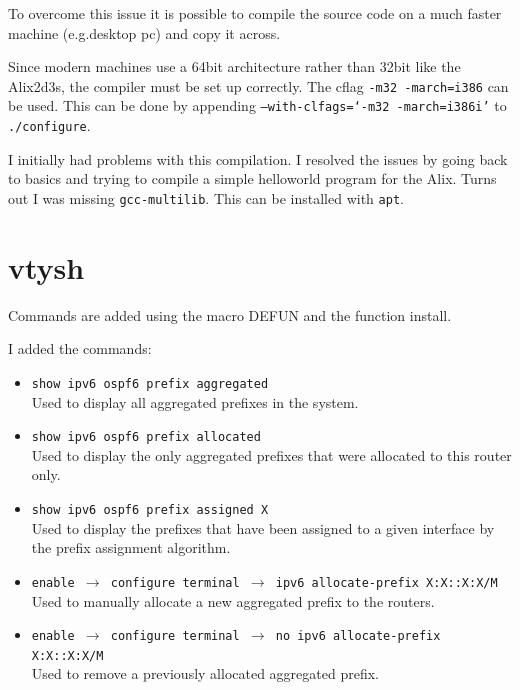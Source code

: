 To overcome this issue it is possible to compile the source code on a much
faster machine (e.g.\@ desktop pc) and copy it across. 

Since modern machines use a 64bit architecture rather than 32bit like the
Alix2d3s, the compiler must be set up correctly. The cflag \texttt{-m32
-march=i386} can be used. This can be done by appending
\texttt{--with-clfags=`-m32 -march=i386i'} to \texttt{\@./configure}.

I initially had problems with this compilation. I resolved the issues by going
back to basics and trying to compile a simple helloworld program for the Alix.
Turns out I was missing \texttt{gcc-multilib}. This can be installed with \texttt{apt}.

\chapter{vtysh}
\label{vtysh}
Commands are added using the macro DEFUN and the function install.

I added the commands:
\begin{itemize}
	\item \texttt{show ipv6 ospf6 prefix aggregated} \\
		Used to display all aggregated prefixes in the system.
	\item \texttt{show ipv6 ospf6 prefix allocated} \\ 
		Used to display the only aggregated prefixes that were allocated to this
		router only.
	\item \texttt{show ipv6 ospf6 prefix assigned X} \\
		Used to display the prefixes that have been assigned to a given interface
		by the prefix assignment algorithm. 


	\item \texttt{enable $\rightarrow$ configure terminal 
		$\rightarrow$ ipv6 allocate-prefix X:X::X:X/M} \\
		Used to manually allocate a new aggregated prefix to the routers.
	\item \texttt{enable $\rightarrow$ configure terminal
		$\rightarrow$ no ipv6 allocate-prefix X:X::X:X/M} \\
		Used to remove a previously allocated aggregated prefix.
\end{itemize}
\pagebreak

